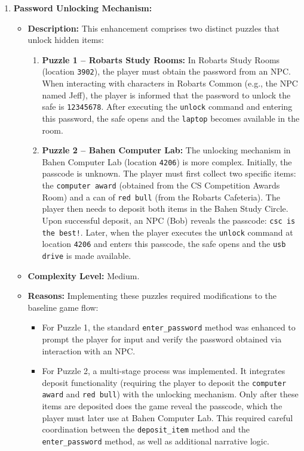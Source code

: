 \documentclass[11pt]{article}
\begin{document}
\begin{enumerate}
    \item \textbf{Password Unlocking Mechanism:}
    \begin{itemize}
        \item \textbf{Description:}  
        This enhancement comprises two distinct puzzles that unlock hidden items:
        \begin{enumerate}
            \item \textbf{Puzzle 1 – Robarts Study Rooms:}  
            In Robarts Study Rooms (location \texttt{3902}), the player must obtain the password from an NPC. When interacting with characters in Robarts Common (e.g., the NPC named Jeff), the player is informed that the password to unlock the safe is \texttt{12345678}. After executing the \texttt{unlock} command and entering this password, the safe opens and the \texttt{laptop} becomes available in the room.
            \item \textbf{Puzzle 2 – Bahen Computer Lab:}  
            The unlocking mechanism in Bahen Computer Lab (location \texttt{4206}) is more complex. Initially, the passcode is unknown. The player must first collect two specific items: the \texttt{computer award} (obtained from the CS Competition Awards Room) and a can of \texttt{red bull} (from the Robarts Cafeteria). The player then needs to deposit both items in the Bahen Study Circle. Upon successful deposit, an NPC (Bob) reveals the passcode: \texttt{csc is the best!}. Later, when the player executes the \texttt{unlock} command at location \texttt{4206} and enters this passcode, the safe opens and the \texttt{usb drive} is made available.
        \end{enumerate}
        \item \textbf{Complexity Level:} Medium.
        \item \textbf{Reasons:}  
        Implementing these puzzles required modifications to the baseline game flow:
        \begin{itemize}
            \item For Puzzle 1, the standard \texttt{enter\_password} method was enhanced to prompt the player for input and verify the password obtained via interaction with an NPC.
            \item For Puzzle 2, a multi-stage process was implemented. It integrates deposit functionality (requiring the player to deposit the \texttt{computer award} and \texttt{red bull}) with the unlocking mechanism. Only after these items are deposited does the game reveal the passcode, which the player must later use at Bahen Computer Lab. This required careful coordination between the \texttt{deposit\_item} method and the \texttt{enter\_password} method, as well as additional narrative logic.

\end{itemize}
\end{itemize}
\end{enumerate}
\end{document}
